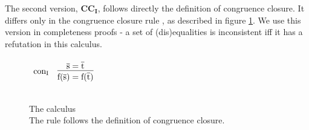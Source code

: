 %

\noindent
The second version, $\mathbf{CC_I}$, follows directly the definition of congruence closure. It differs only in the congruence closure rule , as described in figure \ref{calculus_CC_I}. We use this version in completeness proofs - a set of (dis)equalities is inconsistent iff it has a refutation in this calculus.


\begin{figure}
$
\begin{array}{llll}
	\vspace{10pt}
	\m{con_I} &
	\vcenter{\infer[]{\fa{f}{s}=\fa{f}{t} }{\tup{s}=\tup{t} }} & 
	\parbox[c][1.1cm]{4cm}{} \\
\end{array}
$
\caption{The  calculus\\
The rule  follows the definition of congruence closure.
}
\label{calculus_CC_I}
\end{figure}

